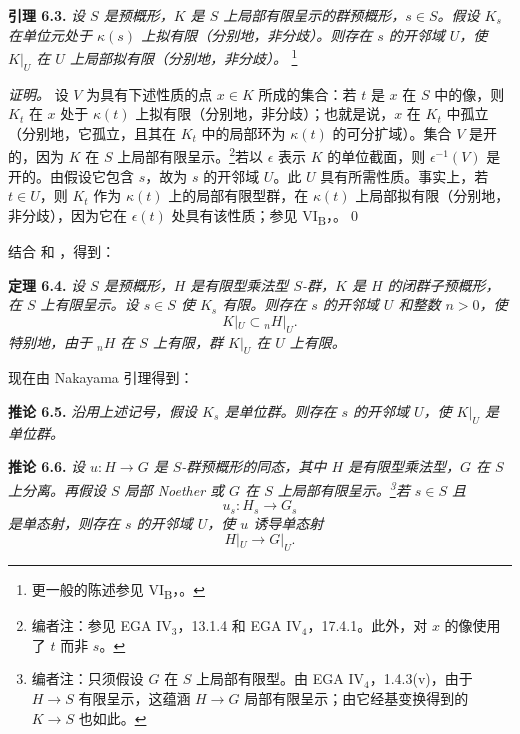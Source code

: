 \medskip
\noindent{}\textbf{引理 6.3.}
\textit{设 \(S\) 是预概形，\(K\) 是 \(S\) 上局部有限呈示的群预概形，\(s\in S\)。假设 \(K_s\) 在单位元处于 \(\kappa(s)\) 上拟有限（分别地，非分歧）。则存在 \(s\) 的开邻域 \(U\)，使 \(K|_U\) 在 \(U\) 上局部拟有限（分别地，非分歧）。}%
\begingroup
\renewcommand{\thefootnote}{\(\ast\)}%
\footnote{更一般的陈述参见 VI\textsubscript{B}，。}%
\addtocounter{footnote}{-1}%
\endgroup

\emph{证明。}
设 \(V\) 为具有下述性质的点 \(x\in K\) 所成的集合：若 \(t\) 是 \(x\) 在 \(S\) 中的像，则 \(K_t\) 在 \(x\) 处于 \(\kappa(t)\) 上拟有限（分别地，非分歧）；也就是说，\(x\) 在 \(K_t\) 中孤立（分别地，它孤立，且其在 \(K_t\) 中的局部环为 \(\kappa(t)\) 的可分扩域）。集合 \(V\) 是开的，因为 \(K\) 在 \(S\) 上局部有限呈示。\footnote{编者注：参见 EGA IV\(_3\)，13.1.4 和 EGA IV\(_4\)，17.4.1。此外，对 \(x\) 的像使用了 \(t\) 而非 \(s\)。}若以 \(\epsilon\) 表示 \(K\) 的单位截面，则 \(\epsilon^{-1}(V)\) 是开的。由假设它包含 \(s\)，故为 \(s\) 的开邻域 \(U\)。此 \(U\) 具有所需性质。事实上，若 \(t\in U\)，则 \(K_t\) 作为 \(\kappa(t)\) 上的局部有限型群，在 \(\kappa(t)\) 上局部拟有限（分别地，非分歧），因为它在 \(\epsilon(t)\) 处具有该性质；参见 VI\textsubscript{B}，。\qed

结合  和 ，得到：

\medskip
\noindent{}\textbf{定理 6.4.}
\textit{设 \(S\) 是预概形，\(H\) 是有限型乘法型 \(S\)-群，\(K\) 是 \(H\) 的闭群子预概形，在 \(S\) 上有限呈示。设 \(s\in S\) 使 \(K_s\) 有限。则存在 \(s\) 的开邻域 \(U\) 和整数 \(n>0\)，使
\[
  K|_U\subset {}_nH|_U.
\]
特别地，由于 \({}_nH\) 在 \(S\) 上有限，群 \(K|_U\) 在 \(U\) 上有限。}

现在由 Nakayama 引理得到：

\medskip
\noindent{}\textbf{推论 6.5.}
\textit{沿用上述记号，假设 \(K_s\) 是单位群。则存在 \(s\) 的开邻域 \(U\)，使 \(K|_U\) 是单位群。}

\medskip
\noindent{}\textbf{推论 6.6.}
\textit{设 \(u:H\to G\) 是 \(S\)-群预概形的同态，其中 \(H\) 是有限型乘法型，\(G\) 在 \(S\) 上分离。再假设 \(S\) 局部 Noether 或 \(G\) 在 \(S\) 上局部有限呈示。\footnote{编者注：只须假设 \(G\) 在 \(S\) 上局部有限型。由 EGA IV\(_4\)，1.4.3(v)，由于 \(H\to S\) 有限呈示，这蕴涵 \(H\to G\) 局部有限呈示；由它经基变换得到的 \(K\to S\) 也如此。}若 \(s\in S\) 且
\[
  u_s:H_s\longrightarrow G_s
\]
是单态射，则存在 \(s\) 的开邻域 \(U\)，使 \(u\) 诱导单态射
\[
  H|_U\longrightarrow G|_U.
\]}

